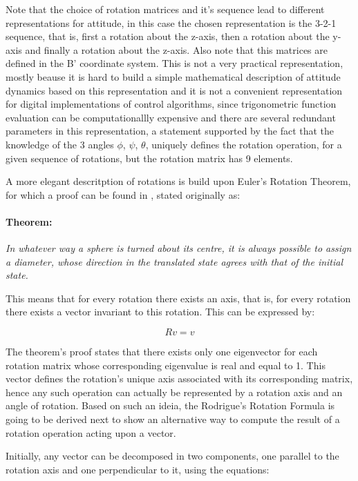 \indent 
	Note that the choice of rotation matrices and it's sequence lead to different representations for attitude, in this case the chosen representation is the 3-2-1 sequence, that is, first a rotation about the z-axis, then a rotation about the y-axis and finally a rotation about the z-axis. Also note that this matrices are defined in the B' coordinate system. This is not a very practical representation, mostly beause it is hard to build a simple mathematical description of attitude dynamics based on this representation and it is not a convenient representation for digital implementations of control algorithms, since trigonometric function evaluation can be computationallly expensive and there are several redundant parameters in this representation, a statement supported by the fact that the knowledge of the 3 angles $\phi$, $\psi$, $\theta$, uniquely defines the rotation operation, for a given sequence of rotations, but the rotation matrix has 9 elements.

\indent
	A more elegant descritption of rotations is build upon Euler's Rotation Theorem, for which a proof can be found in \cite{PALAIS}, stated originally as: 

\paragraph{Theorem: } \textit{In whatever way a sphere is turned about its centre, it is always possible to assign a diameter, whose direction in the translated state agrees with that of the initial state.}

\indent
	This means that for every rotation there exists an axis, that is, for every rotation there exists a vector invariant to this rotation. This can be expressed by: 

\begin{equation}
	Rv = v
\end{equation}

\indent
	The theorem's proof states that there exists only one eigenvector for each rotation matrix whose corresponding eigenvalue is real and equal to 1. This vector defines the rotation's unique axis associated with its corresponding matrix, hence any such operation can actually be represented by a rotation axis and an angle of rotation. Based on such an ideia, the Rodrigue's Rotation Formula is going to be derived next to show an alternative way to compute the result of a rotation operation acting upon a vector.

\indent
	Initially, any vector can be decomposed in two components, one parallel to the rotation axis and one perpendicular to it, using the equations: 

